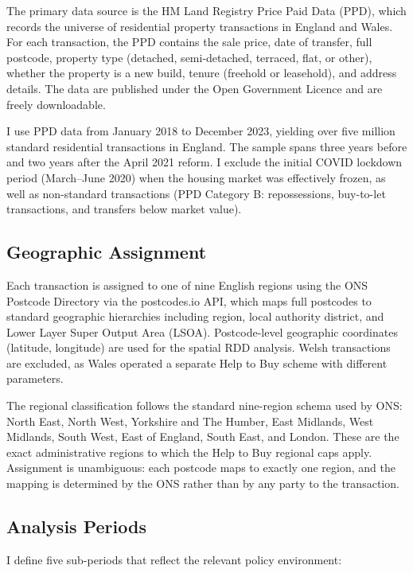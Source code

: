 \documentclass[12pt]{article}
\begin{document}
The primary data source is the HM Land Registry Price Paid Data (PPD), which records the universe of residential property transactions in England and Wales. For each transaction, the PPD contains the sale price, date of transfer, full postcode, property type (detached, semi-detached, terraced, flat, or other), whether the property is a new build, tenure (freehold or leasehold), and address details. The data are published under the Open Government Licence and are freely downloadable.

I use PPD data from January 2018 to December 2023, yielding over five million standard residential transactions in England. The sample spans three years before and two years after the April 2021 reform. I exclude the initial COVID lockdown period (March--June 2020) when the housing market was effectively frozen, as well as non-standard transactions (PPD Category B: repossessions, buy-to-let transactions, and transfers below market value).

\subsection{Geographic Assignment}

Each transaction is assigned to one of nine English regions using the ONS Postcode Directory via the postcodes.io API, which maps full postcodes to standard geographic hierarchies including region, local authority district, and Lower Layer Super Output Area (LSOA). Postcode-level geographic coordinates (latitude, longitude) are used for the spatial RDD analysis. Welsh transactions are excluded, as Wales operated a separate Help to Buy scheme with different parameters.

The regional classification follows the standard nine-region schema used by ONS: North East, North West, Yorkshire and The Humber, East Midlands, West Midlands, South West, East of England, South East, and London. These are the exact administrative regions to which the Help to Buy regional caps apply. Assignment is unambiguous: each postcode maps to exactly one region, and the mapping is determined by the ONS rather than by any party to the transaction.

\subsection{Analysis Periods}

I define five sub-periods that reflect the relevant policy environment:
\end{document}
